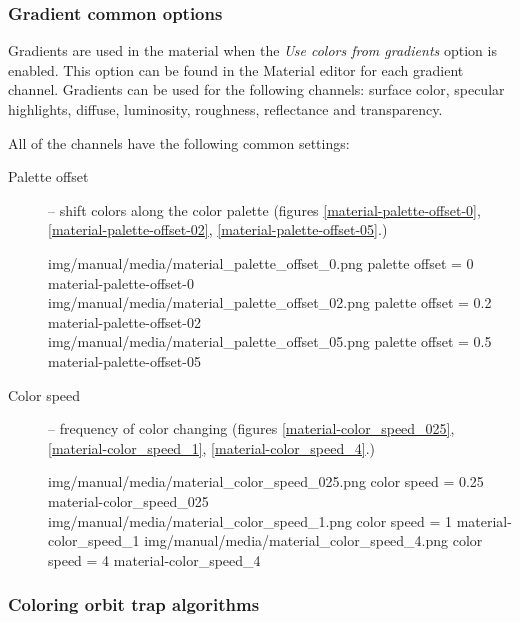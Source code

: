 \subsubsection{Gradient common options}\label{materials-gradient-common-options}

Gradients are used in the material when the \emph{Use colors from gradients} option is enabled. This option can be found in the Material editor for each gradient channel. Gradients can be used for the following channels: surface color, specular highlights, diffuse, luminosity, roughness, reflectance and transparency.

All of the channels have the following common settings:
\begin{description}
	\item[Palette offset] -- shift colors along the color palette (figures \ref{material-palette-offset-0}, \ref{material-palette-offset-02}, \ref{material-palette-offset-05}.)
	
	\threeImagesWithTwoCaptionsFullWidth
	{img/manual/media/material_palette_offset_0.png}
	{palette offset = 0}
	{material-palette-offset-0}
	{img/manual/media/material_palette_offset_02.png}
	{palette offset = 0.2}
	{material-palette-offset-02}
	{img/manual/media/material_palette_offset_05.png}
	{palette offset = 0.5}
	{material-palette-offset-05}
	
	\item[Color speed] -- frequency of color changing (figures \ref{material-color_speed_025}, \ref{material-color_speed_1}, \ref{material-color_speed_4}.)
	
	\threeImagesWithTwoCaptionsFullWidth
	{img/manual/media/material_color_speed_025.png}
	{color speed = 0.25}
	{material-color_speed_025}
	{img/manual/media/material_color_speed_1.png}
	{color speed = 1}
	{material-color_speed_1}
	{img/manual/media/material_color_speed_4.png}
	{color speed = 4}
	{material-color_speed_4}
\end{description}
	
\subsubsection{Coloring orbit trap algorithms}\label{materials-coloring-orbit-trap-algorithms}
	
